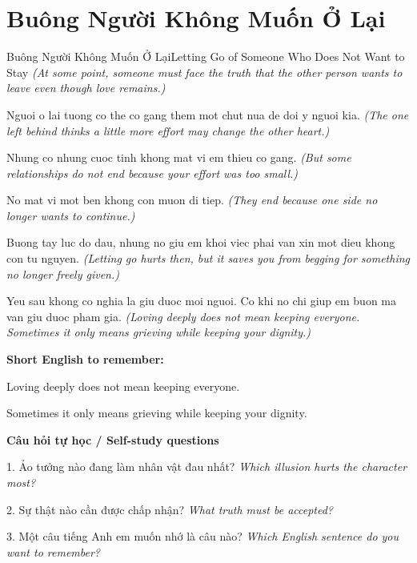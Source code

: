 \section{Buông Người Không Muốn Ở Lại}
\begin{truyen}{Buông Người Không Muốn Ở Lại}{Letting Go of Someone Who Does Not Want to Stay}
\textit{(At some point, someone must face the truth that the other person wants to leave even though love remains.)}

Nguoi o lai tuong co the co gang them mot chut nua de doi y nguoi kia.
\textit{(The one left behind thinks a little more effort may change the other heart.)}

Nhung co nhung cuoc tinh khong mat vi em thieu co gang.
\textit{(But some relationships do not end because your effort was too small.)}

No mat vi mot ben khong con muon di tiep.
\textit{(They end because one side no longer wants to continue.)}

Buong tay luc do dau, nhung no giu em khoi viec phai van xin mot dieu khong con tu nguyen.
\textit{(Letting go hurts then, but it saves you from begging for something no longer freely given.)}

\end{truyen}

\begin{baihoc}
Yeu sau khong co nghia la giu duoc moi nguoi. Co khi no chi giup em buon ma van giu duoc pham gia.
\textit{(Loving deeply does not mean keeping everyone. Sometimes it only means grieving while keeping your dignity.)}
\end{baihoc}

\begin{ghinhoanh}
\textbf{Short English to remember:}

Loving deeply does not mean keeping everyone.

Sometimes it only means grieving while keeping your dignity.

\end{ghinhoanh}

\begin{tuhocnhanh}
\textbf{Câu hỏi tự học / Self-study questions}

1. Ảo tưởng nào đang làm nhân vật đau nhất? \textit{Which illusion hurts the character most?}

2. Sự thật nào cần được chấp nhận? \textit{What truth must be accepted?}

3. Một câu tiếng Anh em muốn nhớ là câu nào? \textit{Which English sentence do you want to remember?}
\end{tuhocnhanh}

